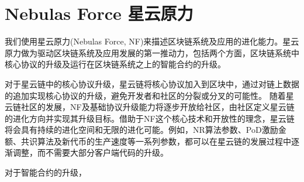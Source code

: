 \section{Nebulas Force 星云原力}
\label{sec:nebulasforce}

我们使用星云原力(Nebulas
Force,
NF)来描述区块链系统及应用的进化能力。星云原力做为驱动区块链系统及应用发展的第一推动力，包括两个方面，区块链系统中核心协议的升级及运行在区块链系统之上的智能合约的升级。

对于星云链中的核心协议升级，星云链将核心协议加入到区块中，通过对链上数据的追加实现核心协议的升级，避免开发者和社区的分裂或分叉的可能性。
随着星云链社区的发展，NF及基础协议升级能力将逐步开放给社区，由社区定义星云链的进化方向并实现其升级目标。借助于NF这个核心技术和开放性的理念，星云链将会具有持续的进化空间和无限的进化可能。例如，NR算法参数、PoD激励金额、共识算法及新代币的生产速度等一系列参数，都可以在星云链的发展过程中逐渐调整，而不需要大部分客户端代码的升级。

对于智能合约的升级，



